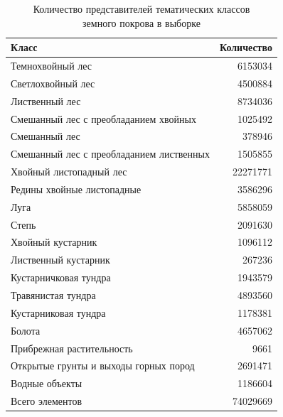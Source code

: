 \documentclass[14pt, a4paper, oneside]{extarticle}
\begin{document}
\begin{table}[H]
    \centering
    \caption{Количество представителей тематических классов\\земного покрова в выборке}
    \begin{tabular}{ m{12.1cm}r }
        \textbf{Класс} & \textbf{Количество} \\
        \hline
        Темнохвойный лес & 6153034 \\
        Светлохвойный лес & 4500884 \\
        Лиственный лес & 8734036 \\
        Смешанный лес с преобладанием хвойных & 1025492 \\
        Смешанный лес & 378946 \\
        Смешанный лес с преобладанием лиственных & 1505855 \\
        Хвойный листопадный лес & 22271771 \\
        Редины хвойные листопадные & 3586296 \\
        Луга & 5858059 \\
        Степь & 2091630 \\
        Хвойный кустарник & 1096112 \\
        Лиственный кустарник & 267236 \\
        Кустарничковая тундра & 1943579 \\
        Травянистая тундра & 4893560 \\
        Кустарниковая тундра & 1178381 \\
        Болота & 4657062 \\
        Прибрежная растительность & 9661 \\
        Открытые грунты и выходы горных пород & 2691471 \\
        Водные объекты & 1186604 \\
        \hline
        Всего элементов & 74029669 \\
    \end{tabular}
\end{table}
\end{document}
